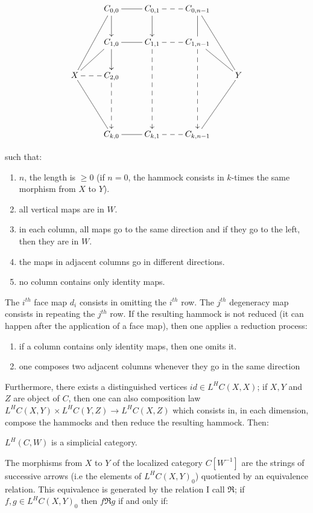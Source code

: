 \[
\xymatrix{& {C_{0,0}} \ar@{-}[r] \ar[d] & {C_{0,1}} \ar[d] \ar@{--}[r] & {C_{0,n-1}} \ar@{-}[d] \ar@{-}[ddr] \\
& {C_{1,0}} \ar@{-}[r] \ar[d] & {C_{1,1}} \ar@{-->}[ddd] \ar@{--}[r] & {C_{1,n-1}} \ar@{-->}[ddd] \ar@{-}[dr] \\
X \ar@{-}[uur] \ar@{-}[ur] \ar@{--}[r] \ar@{-}[ddr] & {C_{2,0}} \ar@{-->}[dd] &&& {Y} \\
                                                                             \\
& {C_{k,0}} \ar@{-}[r] & {C_{k,1}} \ar@{--}[r] & {C_{k,n-1}} \ar@{-}[uur]}
\]

such that:
\begin{enumerate}
\item $n$, the length is $\geq 0$ (if $n=0$, the hammock consists in $k$-times the same morphism from $X$ to $Y$).
\item all vertical maps are in $W$.
\item in each column, all maps go to the same direction and if they go to the left, then they are in $W$.
\item the maps in adjacent columns go in different directions.
\item no column contains only identity maps.
\end{enumerate}

The $i^{th}$ face map $d_i$ consists in omitting the $i^{th}$ row. The $j^{th}$ degeneracy map consists in repeating the $j^{th}$ row. If the resulting hammock is not reduced (it can happen after the application of a face map), then one applies a reduction process:
\begin{enumerate}
\item if a column contains only identity maps, then one omits it.
\item one composes two adjacent columns whenever they go in the same direction
\end{enumerate}

Furthermore, there exists a distinguished vertices $id \in L^HC(X,X)$; if $X,Y$ and $Z$ are object of $C$, then one can also composition law $L^HC(X,Y) \times L^HC(Y,Z) \rightarrow L^H C(X,Z)$ which consists in, in each dimension, compose the hammocks and then reduce the resulting hammock. Then:

\begin{prop}
$L^H (C,W)$ is a simplicial category.
\end{prop}

The morphisms from $X$ to $Y$ of the localized category $C[W^{-1}]$ are the strings of successive arrows (i.e the elements of $L^HC(X,Y)_0$) quotiented by an equivalence relation. This equivalence is generated by the relation I call $\Re$; if $f,g \in L^HC(X,Y)_0$ then $ f \Re g$ if and only if:

